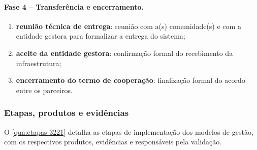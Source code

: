 \paragraph{Fase 4 -- Transferência e encerramento.}
\begin{enumerate}[label=\alph*), resume]
  \item \textbf{reunião técnica de entrega}: reunião com a(s) comunidade(s) e
        com a entidade gestora para formalizar a entrega do sistema;
  \item \textbf{aceite da entidade gestora}: confirmação formal do
        recebimento da infraestrutura;
  \item \textbf{encerramento do termo de cooperação}: finalização formal do
        acordo entre os parceiros.
\end{enumerate}

\subsubsection{Etapas, produtos e evidências}

O \autoref{qua:etapas-3221} detalha as etapas de implementação dos modelos
de gestão, com os respectivos produtos, evidências e responsáveis pela
validação.

